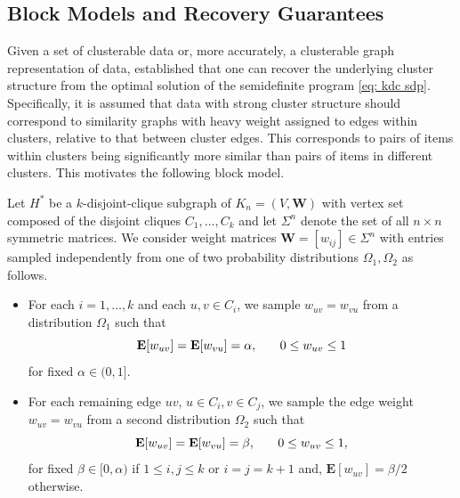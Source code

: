 \documentclass[twoside,11pt]{article}
\newcommand{\E}{\mathbf{E}}
\newcommand{\bs}{\boldsymbol}
\newcommand{\W}{\bs {W}}
\newcommand{\0}{\bs{0}}
\newcommand{\eq}[1]{\(#1\)}
\begin{document}
{\subsection{Block Models and Recovery Guarantees}
\label{sec: rec}
Given a set of {clusterable} data or, more accurately, a {clusterable} graph representation of data, \cite{ames2014guaranteed} established that one can recover the underlying cluster structure from the optimal solution of the semidefinite program \eqref{eq: kdc sdp}.
Specifically, it is assumed that data with strong cluster structure should correspond to similarity graphs
with heavy weight assigned to edges within clusters, relative to that between cluster edges.
This corresponds to pairs of items within clusters being significantly more similar than pairs of items in
different clusters. This motivates the following block model.

Let \(H^*\) be a \(k\)-disjoint-clique subgraph of \(K_n = (V,\W)\) with vertex set composed
of the disjoint cliques \(C_1, \dots, C_k\) and
let \(\Sigma^n\) denote the set of all \(n\times n\) symmetric matrices.
We consider weight matrices \(\W = [w_{ij}] \in \Sigma^n\)
with entries sampled independently from one of two probability distributions \(\Omega_1, \Omega_2\)
as follows. %
\begin{itemize}
	\item
	For each \(i=1, \dots, k\) and each \(u,v \in C_i\),
	we sample \(w_{uv} = w_{vu}\) from a distribution \(\Omega_1\) such that
	\[
	\E[w_{uv}] = \E [w_{vu}] = \alpha, \hspace{0.25in} 0 \le w_{uv} \le 1		
	\]
	for fixed \(\alpha \in (0,1]\).
	\item
	For each remaining 	edge \(uv\),
	\eq{u\in C_i, v \in C_j}, we sample the edge weight \(w_{uv} = w_{vu}\)
	from a second distribution \(\Omega_2\) such that
	\[
	\E[w_{uv}]  = \E[w_{vu}] = \beta, \hspace{0.25in} 0 \le w_{uv} \le 1,
	\]
	for fixed \(\beta \in [0, \alpha) \)
	if ${1 \le i, j \le k}$ or $i=j = k+1$
	and, \(\E[w_{uv}] = \beta/2\) otherwise.
\end{itemize}

}
\end{document}
